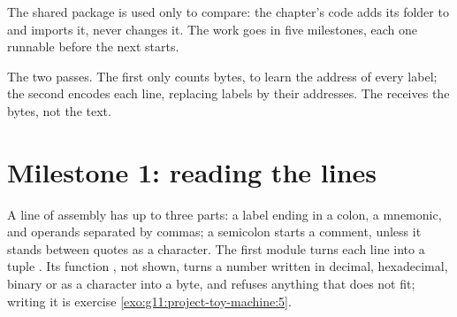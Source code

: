 The shared package is used only to compare: the chapter's code adds its folder to  and imports it,
never changes it. The work goes in five milestones, each one runnable before the next starts.

\begin{omfigure}

{\small The two passes. The first only counts bytes, to learn the address of every label; the second encodes each
line, replacing labels by their addresses. The  receives the bytes, not the text.}
\end{omfigure}

\section{Milestone 1: reading the lines}\label{sec:g11:project-toy-machine:m1}

A line of assembly has up to three parts: a label ending in a colon, a mnemonic, and operands separated by commas;
a semicolon starts a comment, unless it stands between quotes as a character. The first module turns each line into
a tuple . Its function , not shown, turns
a number written in decimal, hexadecimal, binary or as a character into a byte, and refuses anything that does not
fit; writing it is exercise \ref{exo:g11:project-toy-machine:5}.

